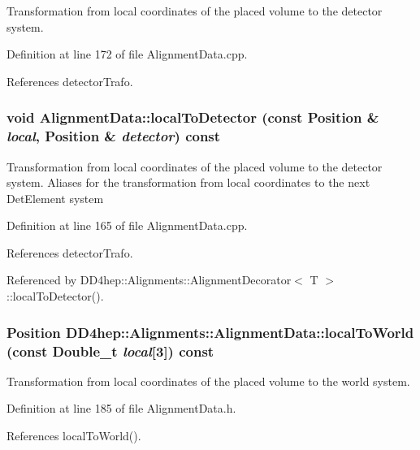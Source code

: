 Transformation from local coordinates of the placed volume to the detector system. 

Definition at line 172 of file AlignmentData.cpp.

References detectorTrafo.\hypertarget{class_d_d4hep_1_1_alignments_1_1_alignment_data_a21619d7d8890ce83f5275eb3351bf141}{
\subsubsection[{localToDetector}]{\setlength{\rightskip}{0pt plus 5cm}void AlignmentData::localToDetector (const Position \& {\em local}, \/  Position \& {\em detector}) const}}
\label{class_d_d4hep_1_1_alignments_1_1_alignment_data_a21619d7d8890ce83f5275eb3351bf141}


Transformation from local coordinates of the placed volume to the detector system. Aliases for the transformation from local coordinates to the next DetElement system 

Definition at line 165 of file AlignmentData.cpp.

References detectorTrafo.

Referenced by DD4hep::Alignments::AlignmentDecorator$<$ T $>$::localToDetector().\hypertarget{class_d_d4hep_1_1_alignments_1_1_alignment_data_a9822d4b558f7c72aabf02ed2af16d2fb}{
\subsubsection[{localToWorld}]{\setlength{\rightskip}{0pt plus 5cm}Position DD4hep::Alignments::AlignmentData::localToWorld (const Double\_\-t {\em local}\mbox{[}3\mbox{]}) const}}
\label{class_d_d4hep_1_1_alignments_1_1_alignment_data_a9822d4b558f7c72aabf02ed2af16d2fb}


Transformation from local coordinates of the placed volume to the world system. 

Definition at line 185 of file AlignmentData.h.

References localToWorld().

